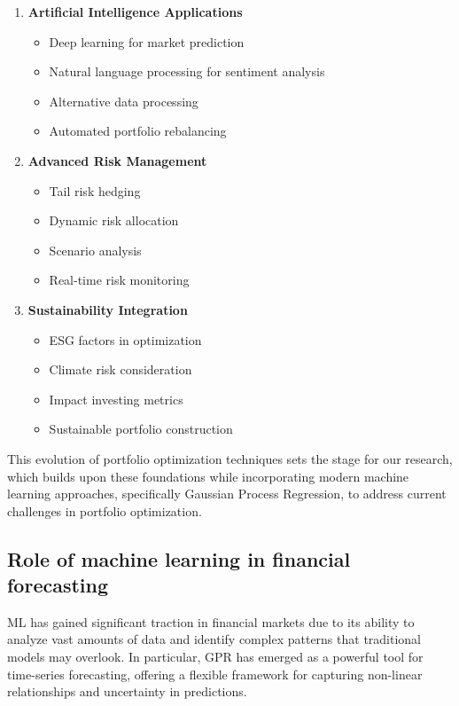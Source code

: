 \begin{enumerate}
    \item \textbf{Artificial Intelligence Applications}
    \begin{itemize}
        \item Deep learning for market prediction
        \item Natural language processing for sentiment analysis
        \item Alternative data processing
        \item Automated portfolio rebalancing
    \end{itemize}

    \item \textbf{Advanced Risk Management}
    \begin{itemize}
        \item Tail risk hedging
        \item Dynamic risk allocation
        \item Scenario analysis
        \item Real-time risk monitoring
    \end{itemize}

    \item \textbf{Sustainability Integration}
    \begin{itemize}
        \item ESG factors in optimization
        \item Climate risk consideration
        \item Impact investing metrics
        \item Sustainable portfolio construction
    \end{itemize}
\end{enumerate}

This evolution of portfolio optimization techniques sets the stage for our research, which builds upon these foundations while incorporating modern machine learning approaches, specifically Gaussian Process Regression, to address current challenges in portfolio optimization.


\subsection{Role of machine learning in financial forecasting}
\ac{ML} has gained significant traction in financial markets due to its ability to analyze vast amounts of data and identify complex patterns that traditional models may overlook.
In particular, \ac{GPR} has emerged as a powerful tool for time-series forecasting, offering a flexible framework for capturing non-linear relationships and uncertainty in predictions.

